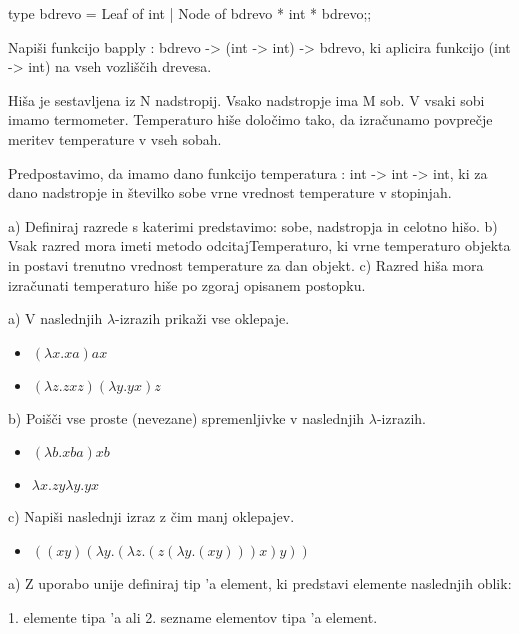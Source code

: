 \begin{ex}
type bdrevo = Leaf of int | Node of bdrevo * int * bdrevo;;

Napi\v si funkcijo bapply : bdrevo -> (int -> int) -> bdrevo, ki aplicira funkcijo (int -> int) na vseh vozli\v s\v cih drevesa.  


\end{ex} \begin{ex}
Hi\v sa je sestavljena iz N nadstropij. Vsako nadstropje ima M sob. V vsaki sobi imamo termometer. Temperaturo hi\v se dolo\v cimo tako, da izra\v cunamo povpre\v cje meritev temperature v vseh sobah. 

Predpostavimo, da imamo dano funkcijo temperatura : int -> int -> int, ki za dano nadstropje in \v stevilko sobe vrne vrednost temperature v stopinjah. 

a) Definiraj razrede s katerimi predstavimo: sobe, nadstropja in celotno hi\v so.
b) Vsak razred mora imeti metodo odcitajTemperaturo, ki vrne temperaturo objekta in  postavi trenutno vrednost temperature za dan objekt.
c) Razred hi\v sa mora izra\v cunati temperaturo hi\v se po zgoraj opisanem postopku.


\end{ex} \begin{ex}
a) V naslednjih $\lambda$-izrazih prika\v zi vse oklepaje.  
\begin{itemize}
\item $(\lambda x.xa)ax$ 
\item $(\lambda z.zxz)(\lambda y.yx)z$ 
\end{itemize}
    
b) Poi\v s\v ci vse proste (nevezane) spremenljivke v naslednjih $\lambda$-izrazih. 
\begin{itemize}
\item $(\lambda b.xba)xb$ 
\item $\lambda x.zy\lambda y.yx $
\end{itemize}

c) Napi\v si naslednji izraz z \v cim manj oklepajev. 

 \begin{itemize}
 \item $((xy)(\lambda y.(\lambda z.(z(\lambda y.(xy)))x)y)) $
 \end{itemize}


\end{ex} \begin{ex}
a) Z uporabo unije definiraj tip 'a element, ki predstavi elemente naslednjih oblik:

    1. elemente tipa 'a ali
    2. sezname elementov tipa 'a element.


\end{ex}
